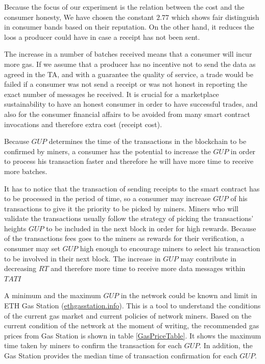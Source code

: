 \documentclass[letterpaper, 10 pt, conference]{ieeeconf}  %
\begin{document}
Because the focus of our experiment is the relation between the cost and the consumer honesty, We have chosen the constant $2.77$ which shows fair distinguish in consumer bands based on their reputation. On the other hand, it reduces the loos a producer could have in case a receipt has not been sent. 

The increase in a number of batches received means that a consumer will incur more gas. If we assume that a producer has no incentive not to send the data as agreed in the TA, and with a guarantee the quality of service, a trade would be failed if a consumer was not send a receipt or was not honest in reporting the exact number of messages he received. It is crucial for a marketplace sustainability to have an honest consumer in order to have successful trades, and also for the consumer financial affairs to be avoided from many smart contract invocations and therefore extra cost (receipt cost).

Because $GUP$ determines the  time of the transactions in the blockchain to be confirmed by miners, a consumer has the potential to increase the $GUP$ in order to process his transaction faster and therefore he will have more time to receive more batches. 

It has to notice that the transaction of sending receipts to the smart contract has to be processed in the period of time, so a consumer may increase $GUP$ of his transactions to give it the priority to be picked by miners. Miners who will validate the transactions usually follow the strategy of picking the transactions’ heights $GUP$ to be included in the next block in order for high rewards. Because of the transactions fees goes to the miners as rewards for their verification, a consumer may set $GUP$ high enough to encourage miners to select his transaction to be involved in their next block. The increase in $GUP$ may contribute in decreasing $RT$ and therefore more time to receive more data messages within $TATI$

A minimum and the maximum $GUP$ in the network could be known and limit in ETH Gas Station (\url{ethgasstation.info}).  This is a tool to understand the conditions of the current gas market and current policies of network miners. 
Based on the current condition of the network at the moment of writing, the recommended gas prices from Gas Station is shown in table \ref{GasPriceTable}. It shows the maximum time taken by miners to confirm the transaction for each $GUP$. In addition, the Gas Station provides the median time of transaction confirmation for each $GUP$.
\end{document}
